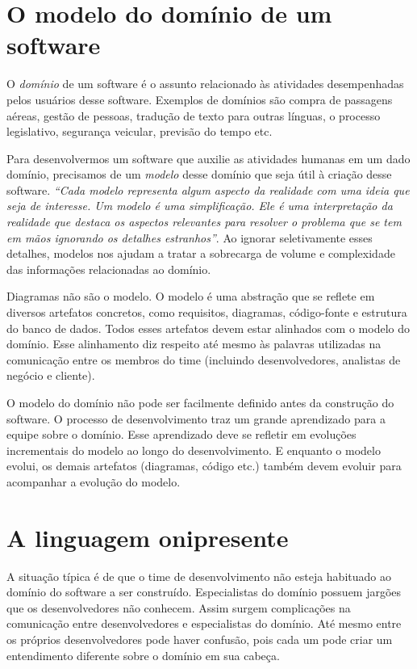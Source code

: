 \documentclass[a4paper, 12pt]{article}
\newcommand{\citacao}[1]{\emph{``#1''}}
\begin{document}
\section{O modelo do domínio de um software}

O \emph{domínio} de um software é o assunto relacionado às atividades desempenhadas pelos usuários desse software. Exemplos de domínios são compra de passagens aéreas, gestão de pessoas, tradução de texto para outras línguas, o processo legislativo, segurança veicular, previsão do tempo etc.

Para desenvolvermos um software que auxilie as atividades humanas em um dado domínio, precisamos de um \emph{modelo} desse domínio que seja útil à criação desse software. \citacao{Cada modelo representa algum aspecto da realidade com uma ideia que seja de interesse. Um modelo é uma simplificação. Ele é uma interpretação da realidade que destaca os aspectos relevantes para resolver o problema que se tem em mãos ignorando os detalhes estranhos}. Ao ignorar seletivamente esses detalhes, modelos nos ajudam a tratar a sobrecarga de volume e complexidade das informações relacionadas ao domínio. 

Diagramas não são o modelo. O modelo é uma abstração que se reflete em diversos artefatos concretos, como requisitos, diagramas, código-fonte e estrutura do banco de dados. Todos esses artefatos devem estar alinhados com o modelo do domínio. Esse alinhamento diz respeito até mesmo às palavras utilizadas na comunicação entre os membros do time (incluindo desenvolvedores, analistas de negócio e cliente).

O modelo do domínio não pode ser facilmente definido antes da construção do software. O processo de desenvolvimento traz um grande aprendizado para a equipe sobre o domínio. Esse aprendizado deve se refletir em evoluções incrementais do modelo ao longo do desenvolvimento. E enquanto o modelo evolui, os demais artefatos (diagramas, código etc.) também devem evoluir para acompanhar a evolução do modelo. 

\section{A linguagem onipresente}

A situação típica é de que o time de desenvolvimento não esteja habituado ao domínio do software a ser construído. Especialistas do domínio possuem jargões que os desenvolvedores não conhecem. Assim surgem complicações na comunicação entre desenvolvedores e especialistas do domínio. Até mesmo entre os próprios desenvolvedores pode haver confusão, pois cada um pode criar um entendimento diferente sobre o domínio em sua cabeça.
\end{document}
